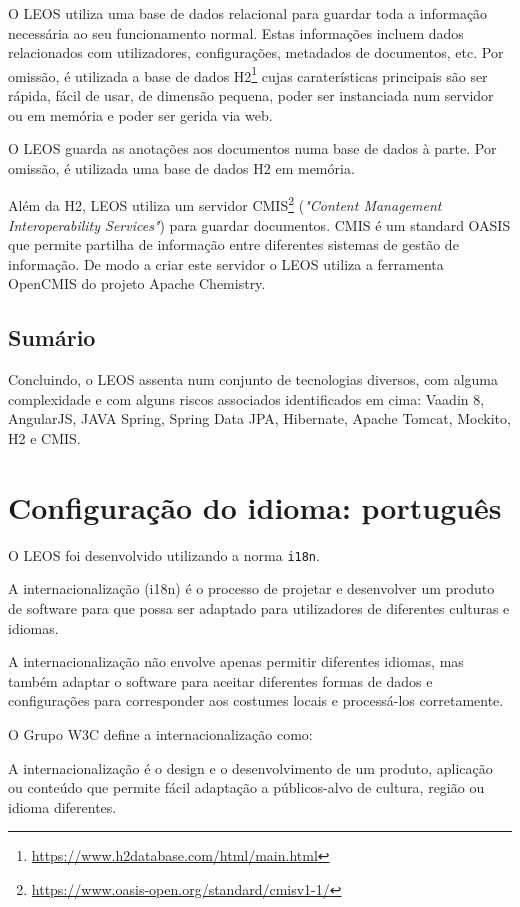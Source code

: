 O LEOS utiliza uma base de dados relacional para guardar toda a informação necessária ao seu funcionamento normal. 
Estas informações incluem dados relacionados com utilizadores, configurações, metadados de documentos, etc. 
Por omissão, é utilizada a base de dados H2\footnote{\url{https://www.h2database.com/html/main.html}} cujas caraterísticas 
principais são ser rápida, fácil de usar, de dimensão pequena, poder ser instanciada num servidor ou em memória e 
poder ser gerida via web.

O LEOS guarda as anotações aos documentos numa base de dados à parte. 
Por omissão, é utilizada uma base de dados H2 em memória.

Além da H2, LEOS utiliza um servidor CMIS\footnote{\url{https://www.oasis-open.org/standard/cmisv1-1/}} 
(\emph{"Content Management Interoperability Services"}) para guardar documentos. 
CMIS é um standard OASIS que permite partilha de informação entre diferentes sistemas de gestão de informação. 
De modo a criar este servidor o LEOS utiliza a  ferramenta OpenCMIS do projeto Apache Chemistry.

\subsection{Sumário}

Concluindo, o LEOS assenta num conjunto de tecnologias diversos, com alguma complexidade e com alguns 
riscos associados identificados em cima: Vaadin 8, AngularJS, JAVA Spring, Spring Data JPA, Hibernate, Apache Tomcat,
Mockito, H2 e CMIS.

\section{Configuração do idioma: português}

O LEOS foi desenvolvido utilizando a norma \texttt{i18n}.

A internacionalização (i18n) é o processo de projetar e desenvolver um produto de software para que possa ser adaptado para 
utilizadores de diferentes culturas e idiomas.

A internacionalização não envolve apenas permitir diferentes idiomas, mas também adaptar o software para aceitar diferentes 
formas de dados e configurações para corresponder aos costumes locais e processá-los corretamente.

O Grupo W3C define a internacionalização como:
\begin{quoting}
A internacionalização é o design e o desenvolvimento de um produto, aplicação ou conteúdo que permite fácil 
adaptação a públicos-alvo de cultura, região ou idioma diferentes.
\end{quoting}



